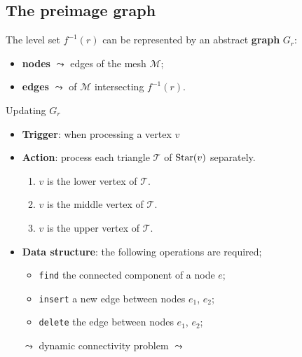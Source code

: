 \subsection*{The preimage graph}
\begin{frame*}
The level set $f^{-1}(r)$ can be represented by an abstract \textbf{graph} $G_r$: %
\begin{itemize}
\item \textbf{nodes} $\leadsto$ edges of the mesh $\mathcal{M}$;
\item \textbf{edges} $\leadsto$  of $\mathcal{M}$ intersecting $f^{-1}(r)$.
\end{itemize}
\begin{block}{Updating $G_r$}
\begin{itemize}
\item \textbf{Trigger}:  when processing a vertex $v$\\
\item \textbf{Action}: process each triangle $\mathcal{T}$ of $\operatorname{Star}(v)$ separately.
\begin{enumerate}
\item $v$ is the lower vertex of $\mathcal{T}$.
\item $v$ is the middle vertex of $\mathcal{T}$.
\item $v$ is the upper vertex of $\mathcal{T}$.
\end{enumerate}
\item \textbf{Data structure}: the following operations are required;
\begin{itemize}
\item \texttt{find} the connected component of a node $e$;
\item \texttt{insert} a new edge between nodes $e_1$, $e_2$;
\item \texttt{delete} the edge between nodes $e_1$, $e_2$;
\end{itemize}
$\leadsto$  dynamic connectivity problem $\leadsto$ 
\end{itemize}
\end{block}
\end{frame*}

